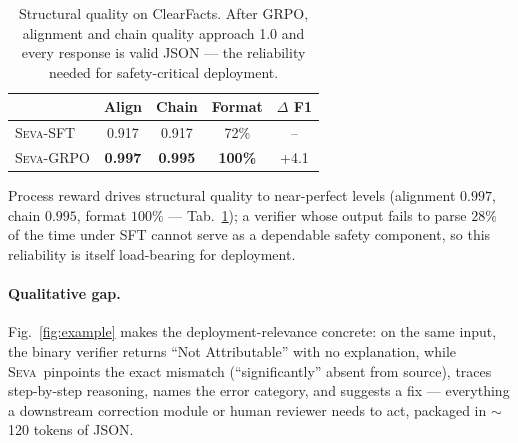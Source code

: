 \documentclass{article}
\newcommand{\seva}{\textsc{Seva}\xspace}
\newcommand{\realnumber}[1]{\textbf{#1}}
\begin{document}
\begin{table}[t]
\centering
\small
\caption{Structural quality on ClearFacts. After GRPO, alignment and chain quality approach 1.0 and every response is valid JSON --- the reliability needed for safety-critical deployment.}
\label{tab:structure}
\begin{tabular}{lcccc}
\toprule
 & \textbf{Align} & \textbf{Chain} & \textbf{Format} & \textbf{$\Delta$ F1} \\
\midrule
\seva-SFT & 0.917 & 0.917 & 72\% & -- \\
\seva-GRPO & \realnumber{0.997} & \realnumber{0.995} & \realnumber{100\%} & +4.1 \\
\bottomrule
\end{tabular}
\end{table}

Process reward drives structural quality to near-perfect levels (alignment $0.997$, chain $0.995$, format $100\%$ --- Tab.~\ref{tab:structure}); a verifier whose output fails to parse $28\%$ of the time under SFT cannot serve as a dependable safety component, so this reliability is itself load-bearing for deployment.

\paragraph{Qualitative gap.} Fig.~\ref{fig:example} makes the deployment-relevance concrete: on the same input, the binary verifier returns ``Not Attributable'' with no explanation, while \seva\ pinpoints the exact mismatch (``significantly'' absent from source), traces step-by-step reasoning, names the error category, and suggests a fix --- everything a downstream correction module or human reviewer needs to act, packaged in $\sim$120 tokens of JSON.
\end{document}
